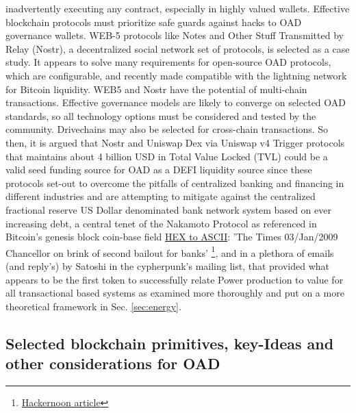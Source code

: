 \documentclass[final,5p,times,twocolumn,authoryear]{elsarticle}
\begin{document}
inadvertently executing any contract, especially in highly valued wallets. Effective blockchain protocols must prioritize safe guards against hacks to OAD governance wallets. WEB-5 protocols like Notes and Other Stuff Transmitted by Relay (Nostr), a decentralized social network set of protocols, is selected as a case study.  It appears to solve many requirements for open-source OAD protocols, which are configurable, and recently made compatible with the lightning network for Bitcoin liquidity. WEB5 and Nostr have the potential of multi-chain transactions. Effective governance models are likely to converge on selected OAD standards, so all technology options must be considered and tested by the community. Drivechains may also be selected for cross-chain transactions.  So then, it is argued that Nostr and  Uniswap Dex via Uniswap v4 Trigger protocols that maintains about 4 billion USD in Total Value Locked (TVL) could be a valid seed funding source for OAD as a DEFI liquidity source since these protocols set-out to overcome the pitfalls of centralized banking and financing in different industries and are attempting to mitigate against the centralized fractional reserve US Dollar denominated bank network system based on ever increasing debt, a central tenet of the Nakamoto Protocol as referenced in Bitcoin's genesis block \textrm{coin-base field} \href{https://www.Blockchain.com/btc/tx/4a5e1e4baab89f3a32518a88c31bc87f618f76673e2cc77ab2127b7afdeda33b}{HEX to ASCII}:  'The Times 03/Jan/2009 Chancellor on brink of second bailout for banks' \footnote{\href{https://hackernoon.com/chancellor-on-brink-of-second-bailout-for-banks-where-to-find-this-on-the-bitcoin-blockchain-hm4k34v4}{Hackernoon article}}, and in a plethora of emails (and reply's) by Satoshi in the cypherpunk's mailing list, that provided what appears to be the first token to successfully relate Power production to value for all transactional based systems as examined more thoroughly and put on a more theoretical framework in Sec. \ref{sec:energy}.

\subsection{Selected blockchain primitives, key-Ideas and other considerations for OAD}
\label{subsec: review}
\end{document}
